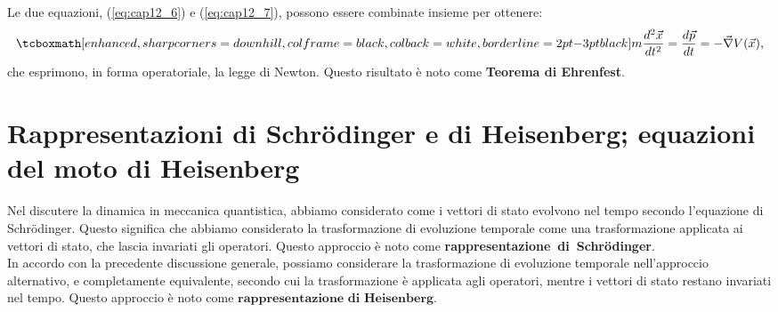 \documentclass[a4paper,12pt,oneside]{book}
\begin{document}
Le due equazioni, (\ref{eq:cap12_6}) e (\ref{eq:cap12_7}), possono essere combinate insieme per ottenere:\\
	\begin{equation}
		\tcboxmath[enhanced, sharp corners=downhill, colframe=black, colback=white, borderline={2pt}{-3pt}{black}]{
			m\frac{d^2\vec{x}}{dt^2}=\frac{d\vec{p}}{dt}=-\vec{\nabla}V(\vec{x}),
			}
	\end{equation}
che esprimono, in forma operatoriale, la legge di Newton. Questo risultato è noto come \textbf{Teorema di Ehrenfest}. 

\section[Rappresentazioni di Schrödinger e di Heisenberg]{Rappresentazioni di Schrödinger e di Heisenberg; equazioni  del moto di Heisenberg}

Nel discutere la dinamica in meccanica quantistica, abbiamo considerato come i vettori di stato evolvono nel tempo secondo l'equazione di Schrödinger. Questo significa che abbiamo considerato la trasformazione di evoluzione temporale come una trasformazione applicata ai vettori di stato, che lascia invariati gli operatori. Questo approccio è noto come \textbf{rappresentazione~di~Schr\"{o}dinger}.\\

In accordo con la precedente discussione generale, possiamo considerare la trasformazione di evoluzione temporale nell'approccio alternativo, e completamente equivalente, secondo cui la trasformazione è applicata agli operatori, mentre i vettori di stato restano invariati nel tempo. Questo approccio è noto come $\textbf{rappresentazione~di~Heisenberg}$.\\
\end{document}

